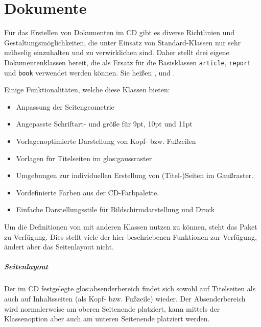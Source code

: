 \chapter{Dokumente}

Für das Erstellen von Dokumenten im \acs{CD} gibt es diverse Richtlinien
und Gestaltungsmöglichkeiten, die unter Einsatz von Standard-Klassen nur sehr
mühselig einzuhalten und zu verwirklichen sind.
Daher stellt \tubslatex drei eigene Dokumentenklassen bereit, die als Ersatz für
die Basisklassen \lstinline{article}, \lstinline{report} und \lstinline{book} 
verwendet werden können. Sie heißen ,
 und .

Einige Funktionalitäten, welche diese Klassen bieten:
\begin{itemize}
  \item Anpassung der Seitengeometrie
  \item Angepasste Schriftart- und größe für 9pt, 10pt und 11pt
  \item Vorlagenoptimierte Darstellung von Kopf- bzw. Fußzeilen
  \item Vorlagen für Titelseiten im \gls{glos:gaussraster}
  \item Umgebungen zur individuellen Erstellung von (Titel-)Seiten im Gaußraster.
  \item Vordefinierte Farben aus der \acs{CD}-Farbpalette.
  \item Einfache Darstellungsstile für Bildschirmdarstellung und Druck
\end{itemize}

\begin{hint}
  Um die Definitionen von \tubslatex mit anderen Klassen nutzen zu können,
  steht das Paket  zu Verfügung.
  Dies stellt viele der hier beschriebenen Funktionen zur Verfügung, ändert
  aber das Seitenlayout nicht.%
\end{hint}


\paragraph{Seitenlayout}

Der im \acs{CD} festgelegte \gls{glos:absenderbereich} findet sich sowohl auf
Titelseiten als auch auf Inhaltsseiten (als Kopf- bzw. Fußzeile) wieder.
Der Absenderbereich wird normalerweise am oberen Seitenende platziert,
kann mittels der Klassenoption  aber auch am unteren
Seitenende platziert werden.

